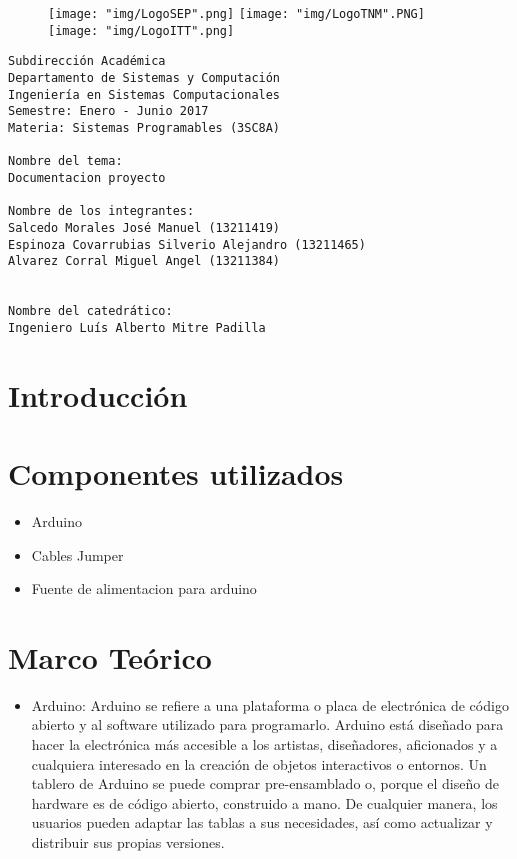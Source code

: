 \documentclass{article}
\begin{document}
\begin{figure}[!htb]
	\texttt{[image: "img/LogoSEP".png]}
\endminipage\hfill
{}
	\texttt{[image: "img/LogoTNM".PNG]}
\endminipage\hfill
{}
	\texttt{[image: "img/LogoITT".png]}
\endminipage\hfill
\end{figure}

\begingroup
\LARGE
\begin{verbatim}
Subdirección Académica
Departamento de Sistemas y Computación
Ingeniería en Sistemas Computacionales
Semestre: Enero - Junio 2017
Materia: Sistemas Programables (3SC8A)

Nombre del tema:
Documentacion proyecto

Nombre de los integrantes:
Salcedo Morales José Manuel (13211419)
Espinoza Covarrubias Silverio Alejandro (13211465)
Alvarez Corral Miguel Angel (13211384)


Nombre del catedrático:
Ingeniero Luís Alberto Mitre Padilla

\end{verbatim}
\endgroup

\newpage
\tableofcontents

\newpage
\section{Introducción}

\section{Componentes utilizados}
\begin{itemize}
        \item Arduino
        \item Cables Jumper
        \item Fuente de alimentacion para arduino
\end{itemize}

\newpage
\section{Marco Teórico}
\begin{itemize}
	\item Arduino: Arduino se refiere a una plataforma o placa de electrónica de código abierto y al software utilizado para programarlo. Arduino está diseñado para hacer la electrónica más accesible a los artistas, diseñadores, aficionados y a cualquiera interesado en la creación de objetos interactivos o entornos. Un tablero de Arduino se puede comprar pre-ensamblado o, porque el diseño de hardware es de código abierto, construido a mano. De cualquier manera, los usuarios pueden adaptar las tablas a sus necesidades, así como actualizar y distribuir sus propias versiones.
\end{itemize}
\end{document}
